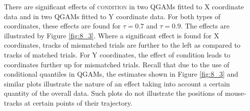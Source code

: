 There are significant effects of \textsc{condition} in two QGAMs fitted to X coordinate data and in two QGAMs fitted to Y coordinate data. For both types of coordinates, these effects are found for $\tau=0.7$ and $\tau=0.9$. The effects are illustrated by Figure \ref{fig:8_3}. Where a significant effect is found for X coordinates, tracks of mismatched trials are further to the left as compared to tracks of matched trials. For Y coordinates, the effect of condition leads to coordinates further up for mismatched trials. Recall that due to the use of conditional quantiles in QGAMs, the estimates shown in Figure \ref{fig:8_3} and similar plots illustrate the nature of an effect taking into account a certain quantity of the overall data. Such plots do not illustrate the positions of mouse-tracks at certain points of their trajectory.

